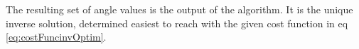 The resulting set of angle values is the output of the algorithm. It is the unique inverse solution, determined easiest to reach with the given cost function in eq \ref{eq:costFuncinvOptim}. 

\newpage




%
